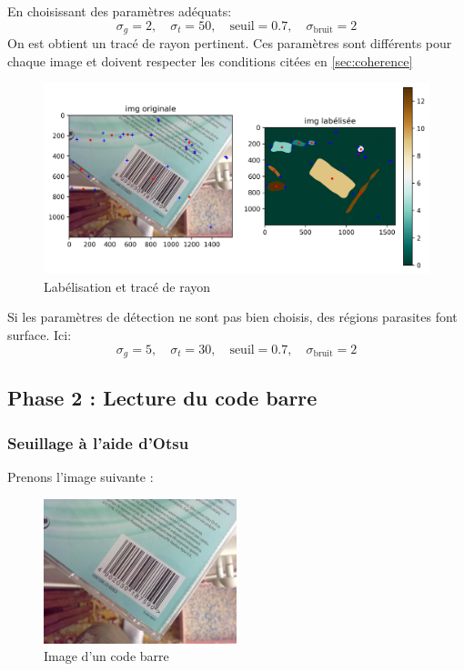 \documentclass{rapport}
\newcommand{\figsize}{1\textwidth}
\begin{document}
En choisissant des paramètres adéquats:
$$\sigma_g = 2, \quad \sigma_t = 50, \quad \text{seuil} = 0.7, \quad \sigma_{\text{bruit}} = 2$$
On est obtient un tracé de rayon pertinent.
\newline Ces paramètres sont différents pour chaque image et doivent respecter les conditions citées en \ref{sec:coherence}
\begin{figure}[H]  
	\centering
	\includegraphics[width=\figsize]{images/Detection/manyblobs.png}
	\caption{Labélisation et tracé de rayon}
	\label{seuil}
\end{figure}
Si les paramètres de détection ne sont pas bien choisis, des régions parasites font surface. Ici:
$$\sigma_g = 5, \quad \sigma_t = 30, \quad \text{seuil} = 0.7, \quad \sigma_{\text{bruit}} = 2$$


\subsection{Phase 2 : Lecture du code barre}

\subsubsection*{Seuillage à l'aide d'Otsu}
Prenons l'image suivante :
\begin{figure}[H] %
	\centering
	\includegraphics[width=0.5\textwidth]{images/barcode0.jpg}
	\caption{Image d'un code barre}
	\label{code_barre}
\end{figure}
\end{document}
